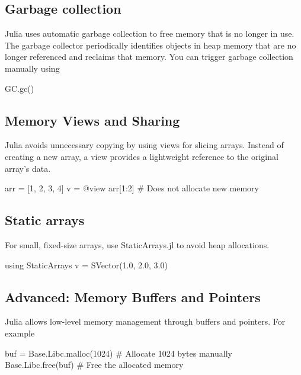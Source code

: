 \documentclass{report}
\begin{document}
     \bigbreak \noindent 
     \subsection{Garbage collection}
     \bigbreak \noindent 
     Julia uses automatic garbage collection to free memory that is no longer in use.
     The garbage collector periodically identifies objects in heap memory that are no longer referenced and reclaims that memory.
     \bigbreak \noindent 
     You can trigger garbage collection manually using
     \bigbreak \noindent 
     \begin{jlcode}
     GC.gc()
     \end{jlcode}

     \bigbreak \noindent 
     \subsection{Memory Views and Sharing}
     \bigbreak \noindent 
     Julia avoids unnecessary copying by using views for slicing arrays. Instead of creating a new array, a view provides a lightweight reference to the original array's data.
     \bigbreak \noindent 
     \begin{jlcode}
     arr = [1, 2, 3, 4]
     v = @view arr[1:2]  # Does not allocate new memory
     \end{jlcode}

     \bigbreak \noindent 
     \subsection{Static arrays}
     \bigbreak \noindent 
     For small, fixed-size arrays, use StaticArrays.jl to avoid heap allocations.
     \bigbreak \noindent 
     \begin{jlcode}
         using StaticArrays
         v = SVector(1.0, 2.0, 3.0)
     \end{jlcode}

     \bigbreak \noindent 
     \subsection{Advanced: Memory Buffers and Pointers}
     \bigbreak \noindent 
     Julia allows low-level memory management through buffers and pointers. For example
     \bigbreak \noindent 
     \begin{jlcode}
         buf = Base.Libc.malloc(1024)  # Allocate 1024 bytes manually
         Base.Libc.free(buf)          # Free the allocated memory
     \end{jlcode}
\end{document}
